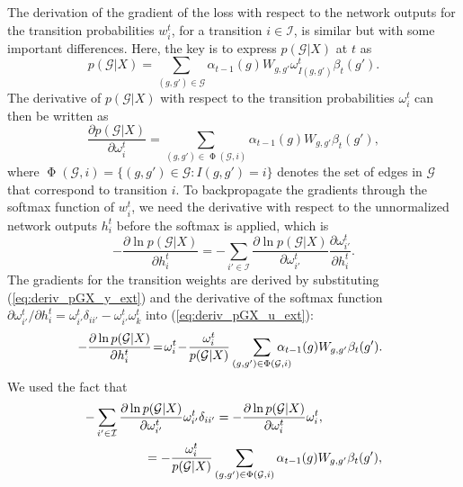 \documentclass{article}
\begin{document}
The derivation of the gradient of the loss with respect to the network outputs for the transition probabilities $w_i^t$, for a transition $i \in \mathcal{I}$, is similar but with some important differences. Here, the key is to express $p(\mathcal{G}|X)$ at $t$ as
\begin{equation}
\label{eq:fw_bw_ext_weights}
    p(\mathcal{G}|X) = \sum_{(g,g') \in \mathcal{G}} \alpha_{t-1}(g) W_{g,g'} \omega^{t}_{I(g,g')}  \beta_t(g').
\end{equation}
The derivative of $p(\mathcal{G}|X)$ with respect to the transition probabilities $\omega_i^t$ can then be written as
\begin{equation}
\label{eq:deriv_pGX_y_ext}
    \frac{\partial  p(\mathcal{G}|X)}{\partial \omega^{t}_{i}}  = \sum_{(g,g') \in \operatorname{\Phi}(\mathcal{G},i)}
    \alpha_{t-1}(g) W_{g,g'} \beta_t(g')  ,
\end{equation}
where $\operatorname{\Phi}(\mathcal{G},i) = \{(g,g') \in \mathcal{G} : I(g,g') = i \}$ denotes the set of edges in $\mathcal{G}$ that correspond to transition $i$. 
To backpropagate the gradients through the softmax function of $w_i^t$, we need the derivative with respect to the unnormalized network outputs $h_i^t$ before the softmax is applied, which is 
\begin{equation}
\label{eq:deriv_pGX_u_ext}
    -\frac{\partial \ln{{p}(\mathcal{G}|X)}}{\partial h_i^t} = - \sum_{i' \in \mathcal{I}} \frac{\partial \ln{{p}(\mathcal{G}|X)}}{\partial \omega_{i'}^{t}} \frac{\partial \omega_{i'}^t}{\partial h_i^t}.
\end{equation}
The gradients for the transition weights are derived by substituting (\ref{eq:deriv_pGX_y_ext}) and the derivative of the softmax function $ \partial \omega_{i'}^t / \partial h_i^t = \omega_{i'}^t \delta_{i i'}  -  \omega_{i'}^t \omega_k^t $ into (\ref{eq:deriv_pGX_u_ext}):
\begin{align}
   \hspace{-.2cm} -\frac{\partial \ln{ p(\mathcal{G}|X)} }{\partial h_i^t}\! =\! \omega_i^t \!-\!  \frac{\omega_i^t}{{p}(\mathcal{G}|X)} \sum_{(g,g') \in \operatorname{\Phi}(\mathcal{G},i)}\!\!\!\!\!\!\!\! \alpha_{t-1}(g) W_{g,g'} \beta_t(g').
\end{align}
We used the fact that
\begin{align}
    -\sum_{i' \in \mathcal{I}} \frac{\partial \ln{{p}(\mathcal{G}|X)}}{\partial \omega_{i'}^t} \omega_{i'}^t \delta_{i i'} &= -\frac{\partial \ln{{p}(\mathcal{G}|X)}}{\partial \omega_{i}^t} \omega_{i}^t ,  \nonumber \\
    &  \hspace{-2cm}= -\frac{\omega_i^t}{{p}(\mathcal{G}|X)} \sum_{(g,g') \in \operatorname{\Phi}(\mathcal{G},i)} \alpha_{t-1}(g) W_{g,g'} \beta_t(g') ,
\end{align}
\end{document}
